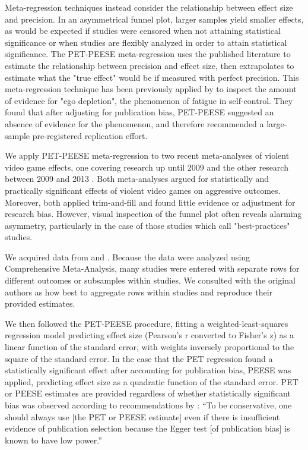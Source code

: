 Meta-regression techniques instead consider the relationship between effect size and precision. In an asymmetrical funnel plot, larger samples yield smaller effects, as would be expected if studies were censored when not attaining statistical significance or when studies are flexibly analyzed in order to attain statistical significance. The PET-PEESE meta-regression \citep{Stanley:Doucouliagos:20XX} uses the published literature to estimate the relationship between precision and effect size, then extrapolates to estimate what the "true effect" would be if measured with perfect precision. This meta-regression technique has been previously applied by \citet{Carter:McCullough:2014} to inspect the amount of evidence for "ego depletion", the phenomenon of fatigue in self-control. They found that after adjusting for publication bias, PET-PEESE suggested an absence of evidence for the phenomenon, and therefore recommended a large-sample pre-registered replication effort.



We apply PET-PEESE meta-regression to two recent meta-analyses of violent video game effects, one covering research up until 2009 \citep{Anderson:etal:2010} and the other research between 2009 and 2013 \citep{Greitemeyer:Mugge:2014}. Both meta-analyses argued for statistically and practically significant effects of violent video games on aggressive outcomes. Moreover, both applied trim-and-fill and found little evidence or adjustment for research bias. However, visual inspection of the funnel plot often reveals alarming asymmetry, particularly in the case of those studies which \citet{Anderson:etal:2010} call "best-practices" studies.

We acquired data from \citet{Anderson:etal:2010} and \citet{Greitemeyer:Mugge:2014}. Because the data were analyzed using Comprehensive Meta-Analysis, many studies were entered with separate rows for different outcomes or subsamples within studies. We consulted with the original authors as how best to aggregate rows within studies and reproduce their provided estimates.

We then followed the PET-PEESE procedure, fitting a weighted-least-squares regression model predicting effect size (Pearson's r converted to Fisher's z) as a linear function of the standard error, with weights inversely proportional to the square of the standard error. In the case that the PET regression found a statistically significant effect after accounting for publication bias, PEESE was applied, predicting effect size as a quadratic function of the standard error. PET or PEESE estimates are provided regardless of whether statistically significant bias was observed according to recommendations by \citet[p. 20-21]{Stanley:Doucouliagos:20XX}: ``To be conservative, one should always use [the PET or PEESE estimate] even if there is insufficient evidence of publication selection because the Egger test [of publication bias] is known to have low power.''

